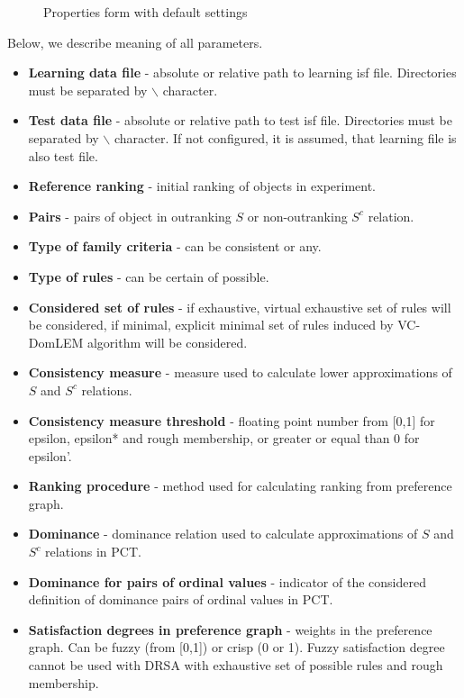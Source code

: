 \begin{figure*}[!ht] 
	\centering
	\caption{Properties form with default settings}
\end{figure*}

Below, we describe meaning of all parameters.
\begin{itemize}
	\item \textbf{Learning data file} - absolute or relative path to learning isf file. Directories must be separated by $\backslash$ character.
	\item \textbf{Test data file} - absolute or relative path to test isf file. Directories must be separated by $\backslash$ character. If not configured, it is assumed, that learning file is also test file.
	\item \textbf{Reference ranking} - initial ranking of objects in experiment.
	\item \textbf{Pairs} - pairs of object in outranking $S$ or non-outranking $S^{c}$ relation.
	\item \textbf{Type of family criteria} - can be consistent or any.
	\item \textbf{Type of rules} - can be certain of possible.
	\item \textbf{Considered set of rules} - if exhaustive, virtual exhaustive set of rules will be considered, if minimal, explicit minimal set of rules induced by VC-DomLEM algorithm will be considered.
	\item \textbf{Consistency measure} - measure used to calculate lower approximations of $S$ and $S^{c}$ relations.
	\item \textbf{Consistency measure threshold} - floating point number from [0,1] for epsilon, epsilon* and rough membership, or greater or equal than 0 for epsilon'.
	\item \textbf{Ranking procedure} - method used for calculating ranking from preference graph.
	\item \textbf{Dominance} - dominance relation used to calculate approximations of $S$ and $S^{c}$ relations in PCT.
	\item \textbf{Dominance for pairs of ordinal values} - indicator of the considered definition of dominance pairs of ordinal values in PCT.
	\item \textbf{Satisfaction degrees in preference graph} - weights in the preference graph. Can be fuzzy (from [0,1]) or crisp (0 or 1). Fuzzy satisfaction degree cannot be used with DRSA with exhaustive set of possible rules and rough membership.

\end{itemize}
